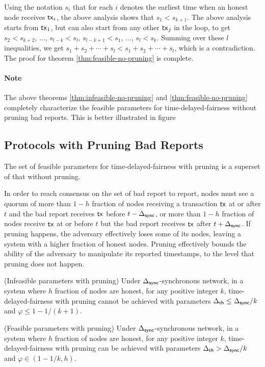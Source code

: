 Using the notation $s_i$ that for each $i$ denotes the earliest time when an honest node receives $\mathsf{tx}_i$, the above analysis shows that $s_1<s_{k+1}$. The above analysis starts from $\mathsf{tx}_1$, but can also start from any other $\mathsf{tx}_j$ in the loop, to get $s_2<s_{k+2}$, $\dots$, $s_{l-k}<s_l$, $s_{l-k+1}<s_1$, $\dots$, $s_{l}<s_{k}$. Summing over these $l$ inequalities, we get $s_1+s_2+\cdots + s_l < s_1+s_2+\cdots + s_l$, which is a contradiction. The proof for theorem \ref{thm:feasible-no-pruning} is complete.

\paragraph{Note} The above theorems \ref{thm:infeasible-no-pruning} and \ref{thm:feasible-no-pruning} completely characterize the feasible parameters for time-delayed-fairness without pruning bad reports. This is better illustrated in figure %


\subsection{Protocols with Pruning Bad Reports}
The set of feasible parameters for time-delayed-fairness with pruning is a superset of that without pruning. 

In order to reach consensus on the set of bad report to report, nodes must see a quorum of more than $1-h$ fraction of nodes receiving a transaction $\mathsf{tx}$ at or after $t$ and the bad report receives $\mathsf{tx}$ before $t-\Delta_{\mathsf{sync}}$, or more than $1-h$ fraction of nodes receive $\mathsf{tx}$ at or before $t$ but the bad report receives $\mathsf{tx}$ after $t+\Delta_{\mathsf{sync}}$. If pruning happens, the adversary effectively loses some of its nodes, leaving a system with a higher fraction of honest nodes. Pruning effectively bounds the ability of the adversary to manipulate its reported timestamps, to the level that pruning does not happen. 

\begin{theorem}{(Infeasible parameters with pruning)}\label{thm:infeasible-pruning}
    Under $\Delta_{\mathsf{sync}}$-synchronous network, in a system  where $h$ fraction of nodes are honest, for any positive integer $k$, time-delayed-fairness with pruning cannot be achieved with parameters $\Delta_{\mathsf{th}}\le\Delta_{\mathsf{sync}}/k$ and $\varphi \le 1-1/(k+1)$.
\end{theorem}

\begin{theorem}
{(Feasible parameters with pruning)}\label{thm:feasible-pruning}
    Under $\Delta_{\mathsf{sync}}$-synchronous network, in a system  where $h$ fraction of nodes are honest, for any positive integer $k$, time-delayed-fairness with pruning can be achieved with parameters $\Delta_{\mathsf{th}}>\Delta_{\mathsf{sync}}/k$ and $\varphi\in(1-1/k,h)$.
\end{theorem}

